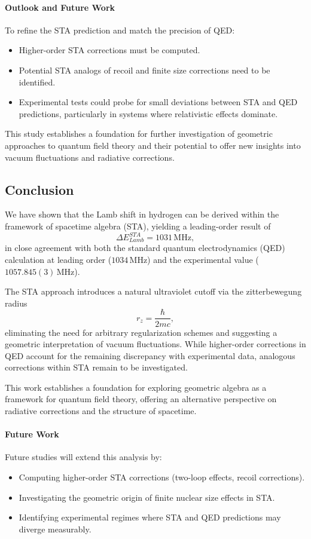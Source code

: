 \documentclass[12pt]{article}
\begin{document}
\paragraph{Outlook and Future Work}
To refine the STA prediction and match the precision of QED:
\begin{itemize}
    \item Higher-order STA corrections must be computed.
    \item Potential STA analogs of recoil and finite size corrections need to be identified.
    \item Experimental tests could probe for small deviations between STA and QED predictions, particularly in systems where relativistic effects dominate.
\end{itemize}

This study establishes a foundation for further investigation of geometric approaches to quantum field theory and their potential to offer new insights into vacuum fluctuations and radiative corrections.

\subsection{Conclusion}\label{sec:conclusion}

We have shown that the Lamb shift in hydrogen can be derived within the framework of spacetime algebra (STA), yielding a leading-order result of
\[
\Delta E_{Lamb}^{STA} = 1031\,\mathrm{MHz},
\]
in close agreement with both the standard quantum electrodynamics (QED) calculation at leading order (\(1034\,\mathrm{MHz}\)) and the experimental value (\(1057.845(3)\,\mathrm{MHz}\)).  

The STA approach introduces a natural ultraviolet cutoff via the zitterbewegung radius
\[
r_z = \frac{\hbar}{2mc},
\]
eliminating the need for arbitrary regularization schemes and suggesting a geometric interpretation of vacuum fluctuations. While higher-order corrections in QED account for the remaining discrepancy with experimental data, analogous corrections within STA remain to be investigated.  

This work establishes a foundation for exploring geometric algebra as a framework for quantum field theory, offering an alternative perspective on radiative corrections and the structure of spacetime.

\paragraph{Future Work}
Future studies will extend this analysis by:
\begin{itemize}
    \item Computing higher-order STA corrections (two-loop effects, recoil corrections).
    \item Investigating the geometric origin of finite nuclear size effects in STA.
    \item Identifying experimental regimes where STA and QED predictions may diverge measurably.
\end{itemize}
\end{document}
